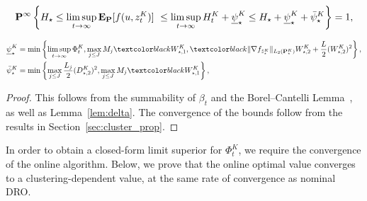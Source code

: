 \begin{theorem}
\label{thm:asym}

\begin{equation*} 
\mathbf{P}^\infty\left\{ H_\star \leq  \limsup_{t \rightarrow \infty }\mathbf{E}_{\mathbf{P}}[f(u, z^K_{t})]\ \leq \limsup_{t \rightarrow \infty } H^K_t + \underline{\psi}_\star^K \leq H_\star + \underline{\psi}_\star^K + \bar{\psi}_\star^K \right\} = 1,
\end{equation*}

\begin{equation*}
    \begin{aligned}
        \underline{\psi}_\star^K &= \min \left\{
   \limsup_{t \rightarrow \infty } {\Phi^K_t},
        \max_{j\leq J}M_j\RC{\ld^K_{\star,1}}, \RC{\|\nabla f_{\hat{z}^K_\star}\|_{L_2(\prob^K_\star)}\ld^K_{\star,2} + \frac{L}{2}(\ld^K_{\star,2})^2}\right\},\\
        \bar{\psi}_\star^K &=
\min \left\{ {\max_{j \leq J}\frac{L_j}{2}}(D^K_{\star,2})^2,  \max_{j\leq J}M_j\RC{\ld^K_{\star,1}}\right\},
    \end{aligned}
\end{equation*}
\end{theorem}
\begin{proof}
    This follows from the summability of $\beta_t$ and the Borel–Cantelli Lemma~\cite[Theorem 2.18]{borel}, as well as Lemma~\ref{lem:delta}. 
    The convergence of the bounds follow from the results in Section~\ref{sec:cluster_prop}. 
\end{proof}
In order to obtain a closed-form limit superior for ${\Phi^K_t}$, we require the convergence of the online algorithm. 
Below, we prove that the online optimal value converges to a clustering-dependent value, at the same rate of convergence as nominal \gls{DRO}. 
